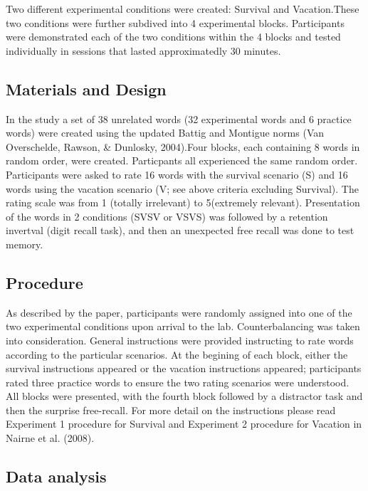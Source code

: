 \documentclass[man]{apa6}
\begin{document}
Two different experimental conditions were created: Survival and Vacation.These two conditions were further subdived into 4 experimental blocks. Participants were demonstrated each of the two conditions within the 4 blocks and tested individually in sessions that lasted approximatedly 30 minutes.

\hypertarget{materials-and-design}{%
\subsection{Materials and Design}\label{materials-and-design}}

In the study a set of 38 unrelated words (32 experimental words and 6 practice words) were created using the updated Battig and Montigue norms (Van Overschelde, Rawson, \& Dunlosky, 2004).Four blocks, each containing 8 words in random order, were created. Particpants all experienced the same random order. Participants were asked to rate 16 words with the survival scenario (S) and 16 words using the vacation scenario (V; see above criteria excluding Survival). The rating scale was from 1 (totally irrelevant) to 5(extremely relevant). Presentation of the words in 2 conditions (SVSV or VSVS) was followed by a retention invertval (digit recall task), and then an unexpected free recall was done to test memory.

\hypertarget{procedure}{%
\subsection{Procedure}\label{procedure}}

As described by the paper, participants were randomly assigned into one of the two experimental conditions upon arrival to the lab. Counterbalancing was taken into consideration. General instructions were provided instructing to rate words according to the particular scenarios. At the begining of each block, either the survival instructions appeared or the vacation instructions appeared; participants rated three practice words to ensure the two rating scenarios were understood. All blocks were presented, with the fourth block followed by a distractor task and then the surprise free-recall. For more detail on the instructions please read Experiment 1 procedure for Survival and Experiment 2 procedure for Vacation in Nairne et al. (2008).

\hypertarget{data-analysis}{%
\subsection{Data analysis}\label{data-analysis}}
\end{document}
